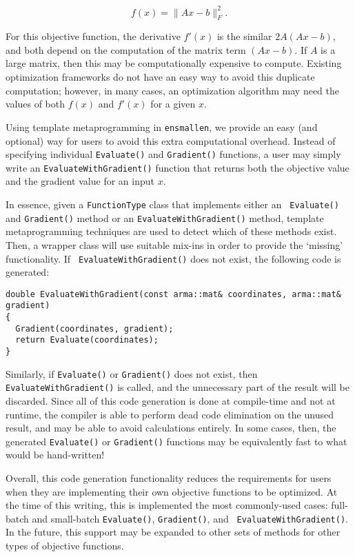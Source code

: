 \documentclass{article}
\begin{document}
\begin{equation}
f(x) = \| Ax - b \|_F^2.
\end{equation}

For this objective function, the derivative $f'(x)$ is the similar $2A(Ax - b)$,
and both depend on the computation of the matrix term $(Ax - b)$.  If $A$ is a
large matrix, then this may be computationally expensive to compute.  Existing
optimization frameworks do not have an easy way to avoid this duplicate
computation; however, in many cases, an optimization algorithm may need the
values of both $f(x)$ and $f'(x)$ for a given $x$.

Using template metaprogramming in {\tt ensmallen}, we provide an easy (and
optional) way for users to avoid this extra computational overhead.  Instead of
specifying individual {\tt Evaluate()} and {\tt Gradient()} functions, a user
may simply write an {\tt EvaluateWithGradient()} function that returns both the
objective value and the gradient value for an input $x$.

In essence, given a {\tt FunctionType} class that implements either an {\tt
Evaluate()} and {\tt Gradient()} method or an {\tt EvaluateWithGradient()}
method, template metaprogramming techniques are used to detect which of these
methods exist.  Then, a wrapper class will use suitable mix-ins %
in order to provide the `missing' functionality.  If {\tt
EvaluateWithGradient()} does not exist, the following code is generated:

\begin{verbatim}
double EvaluateWithGradient(const arma::mat& coordinates, arma::mat& gradient)
{
  Gradient(coordinates, gradient);
  return Evaluate(coordinates);
}
\end{verbatim}

Similarly, if {\tt Evaluate()} or {\tt Gradient()} does not exist, then {\tt
EvaluateWithGradient()} is called, and the unnecessary part of the result will
be discarded.  Since all of this code generation is done at compile-time and not
at runtime, the compiler is able to perform dead code elimination %
on the unused result, and may be able to avoid calculations entirely.  In some
cases, then, the generated {\tt Evaluate()} or {\tt Gradient()} functions may be
equivalently fast to what would be hand-written!

Overall, this code generation functionality reduces the requirements for users
when they are implementing their own objective functions to be optimized.  At
the time of this writing, this is implemented the most commonly-used cases:
full-batch and small-batch {\tt Evaluate()}, {\tt Gradient()}, and {\tt
EvaluateWithGradient()}.  In the future, this support may be expanded to other
sets of methods for other types of objective functions.
\end{document}
